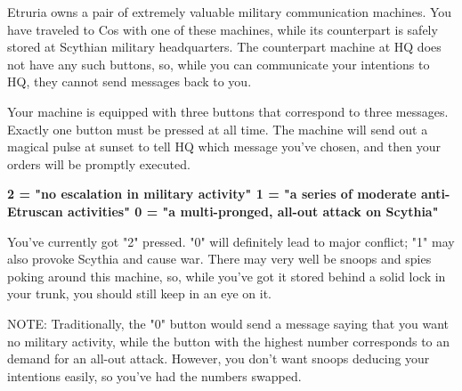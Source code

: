 \documentclass[green]{Kos}
\begin{document}
\name{\gScythiaMachine{}}

Etruria owns a pair of extremely valuable military communication machines. You have traveled to Cos with one of these machines, while its counterpart is safely stored at Scythian military headquarters. The counterpart machine at HQ does not have any such buttons, so, while you can communicate your intentions to HQ, they cannot send messages back to you. 

Your machine is equipped with three buttons that correspond to three messages. Exactly one button must be pressed at all time. The machine will send out a magical pulse at sunset to tell HQ which message you've chosen, and then your orders will be promptly executed.

\bf{2} = "no escalation in military activity"
\bf{1} = "a series of moderate anti-Etruscan activities"
\bf{0} = "a multi-pronged, all-out attack on Scythia"

You've currently got "2" pressed. "0" will definitely lead to major conflict; "1" may also provoke Scythia and cause war. There may very well be snoops and spies poking around this machine, so, while you've got it stored behind a solid lock in your trunk, you should still keep in an eye on it.

NOTE: Traditionally, the "0" button would send a message saying that you want no military activity, while the button with the highest number corresponds to an demand for an all-out attack. However, you don't want snoops deducing your intentions easily, so you've had the numbers swapped.
\end{document}
